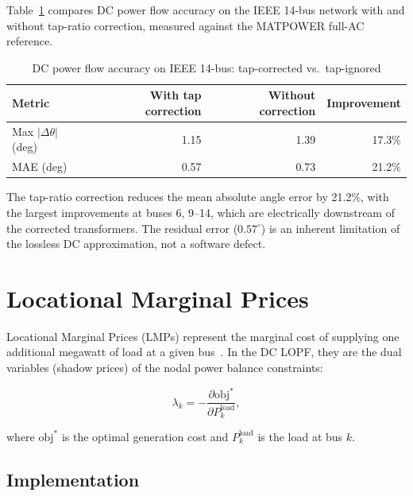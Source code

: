 Table~\ref{tab:tap_correction} compares DC power flow accuracy on the IEEE 14-bus network with and without tap-ratio correction, measured against the MATPOWER full-AC reference.

\begin{table}[H]
\centering
\caption{DC power flow accuracy on IEEE 14-bus: tap-corrected vs.\ tap-ignored}
\label{tab:tap_correction}
\begin{tabular}{lrrr}
\toprule
\textbf{Metric} & \textbf{With tap correction} & \textbf{Without correction} & \textbf{Improvement} \\
\midrule
Max $|\Delta\theta|$ (deg) & 1.15 & 1.39 & 17.3\% \\
MAE (deg)                  & 0.57 & 0.73 & 21.2\% \\
\bottomrule
\end{tabular}
\end{table}

The tap-ratio correction reduces the mean absolute angle error by 21.2\%, with the largest improvements at buses 6, 9--14, which are electrically downstream of the corrected transformers. The residual error ($0.57^\circ$) is an inherent limitation of the lossless DC approximation, not a software defect.

\section{Locational Marginal Prices}
\label{sec:lmp}

Locational Marginal Prices (LMPs) represent the marginal cost of supplying one additional megawatt of load at a given bus~\cite{schweppe1988}. In the DC LOPF, they are the dual variables (shadow prices) of the nodal power balance constraints:

\begin{equation}
    \lambda_k = -\frac{\partial \text{obj}^*}{\partial P_k^\text{load}},
    \label{eq:lmp_def}
\end{equation}

where $\text{obj}^*$ is the optimal generation cost and $P_k^\text{load}$ is the load at bus $k$.

\subsection{Implementation}

